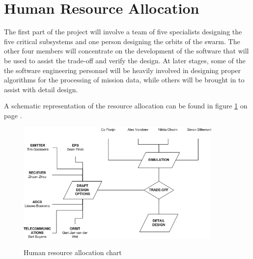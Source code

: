\section{Human Resource Allocation}
\label{blHR}
The first part of the project will involve a team of five specialists designing the five critical subsystems and one person designing the orbits of the swarm. The other four members will concentrate on the development of the software that will be used to assist the trade-off and verify the design. At later stages, some of the the software engineering personnel will be heavily involved in designing proper algorithms for the processing of mission data, while others will be brought in to assist with detail design. 

A schematic representation of the resource allocation can be found in figure \ref{fig:blBBHR} on page \pageref{fig:blBBHR}.

\begin{figure}[ht!]
\begin{center}
\includegraphics[width=0.9\textwidth]{chapters/img/HR.png}
\label{fig:blBBHR}
\caption{Human resource allocation chart}
\end{center}
\end{figure}